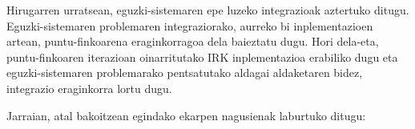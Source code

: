 
Hirugarren urratsean, eguzki-sistemaren epe luzeko integrazioak aztertuko ditugu.
Eguzki-sistemaren problemaren integraziorako, aurreko bi inplementazioen artean, puntu-finkoarena eraginkorragoa dela baieztatu dugu. Hori dela-eta, puntu-finkoaren iterazioan oinarritutako IRK inplementazioa erabiliko dugu eta eguzki-sistemaren problemarako pentsatutako aldagai aldaketaren bidez, integrazio eraginkorra lortu dugu. 

Jarraian, atal bakoitzean egindako ekarpen nagusienak laburtuko ditugu:


